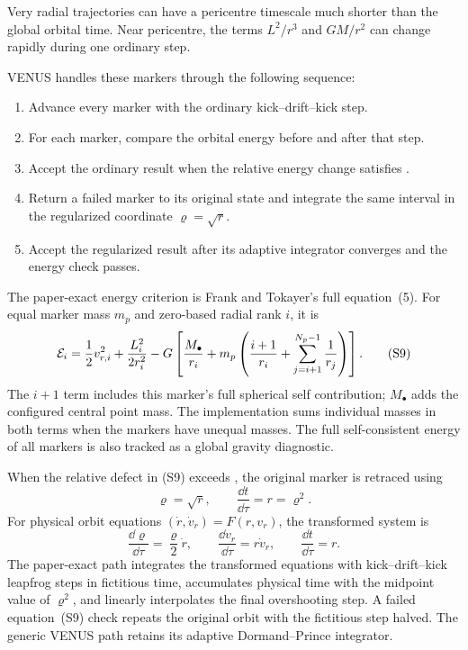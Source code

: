 Very radial trajectories can have a pericentre timescale much shorter than
the global orbital time.  Near pericentre, the terms \(L^2/r^3\) and
\(GM/r^2\) can change rapidly during one ordinary step.

VENUS handles these markers through the following sequence:
\begin{enumerate}
\item Advance every marker with the ordinary kick--drift--kick step.
\item For each marker, compare the orbital energy before and after that step.
\item Accept the ordinary result when the relative energy change satisfies
      .
\item Return a failed marker to its original state and integrate the same
      interval in the regularized coordinate \(\varrho=\sqrt r\).
\item Accept the regularized result after its adaptive integrator converges
      and the energy check passes.
\end{enumerate}

The paper-exact energy criterion is Frank and Tokayer's full equation~(5).
For equal marker mass \(m_p\) and zero-based radial rank \(i\), it is
\[
 {\cal E}_i
 =\frac12v_{r,i}^2+\frac{L_i^2}{2r_i^2}
  -G\left[\frac{M_\bullet}{r_i}
  +m_p\left(\frac{i+1}{r_i}
  +\sum_{j=i+1}^{N_p-1}\frac1{r_j}\right)\right]. \tag{S9}
\]
The \(i+1\) term includes this marker's full spherical self contribution;
\(M_\bullet\) adds the configured central point mass.  The implementation
sums individual masses in both terms when the markers have unequal masses.
The full self-consistent energy of all markers is also tracked as a global
gravity diagnostic.

When the relative defect in (S9) exceeds
, the original marker is retraced using
\[
 \varrho=\sqrt r,\qquad \frac{\dd t}{\dd\tau}=r=\varrho^2. \tag{S10}
\]
For physical orbit equations
\((\dot r,\dot v_r)=F(r,v_r)\), the transformed system is
\[
 \frac{\dd\varrho}{\dd\tau}
   =\frac{\varrho}{2}\dot r,\qquad
 \frac{\dd v_r}{\dd\tau}=r\dot v_r,\qquad
 \frac{\dd t}{\dd\tau}=r.                                 \tag{S11}
\]
The paper-exact path integrates the transformed equations with
kick--drift--kick leapfrog steps in fictitious time, accumulates physical time
with the midpoint value of \(\varrho^2\), and linearly interpolates the final
overshooting step.  A failed equation~(S9) check repeats the original orbit
with the fictitious step halved.  The generic VENUS path retains its adaptive
Dormand--Prince integrator.

